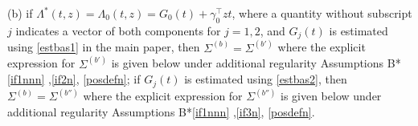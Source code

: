 \documentclass[11pt]{article}
\newcommand{\eqnn}{\begin{eqnarray*}}
\newcommand{\een}{\end{eqnarray*}}
\begin{document}
(b) if  $\Lambda^{*}(t,z)=\Lambda_0(t,z)=G_{0}(t) + \gamma_{0}^{\top} z t$, where a quantity without subscript $j$ indicates a vector of both components for $j=1,2$, 
and $G_{j}(t)$ is estimated using \eqref{estbas1} in the main paper, then $ \Sigma^{(b)} =  \Sigma^{(b')}$ where the explicit expression for $ \Sigma^{(b')}$ is given below under additional regularity Assumptions  B*\ref{if1nnn} ,\ref{if2n}, \ref{posdefn};
if $G_j(t)$ is estimated using \eqref{estbas2},
 then $ \Sigma^{(b)} =  \Sigma^{(b'')}$ where the explicit expression for $ \Sigma^{(b'')}$ is given below under additional regularity Assumptions  B*\ref{if1nnn} ,\ref{if3n}, \ref{posdefn}.



\end{document}
